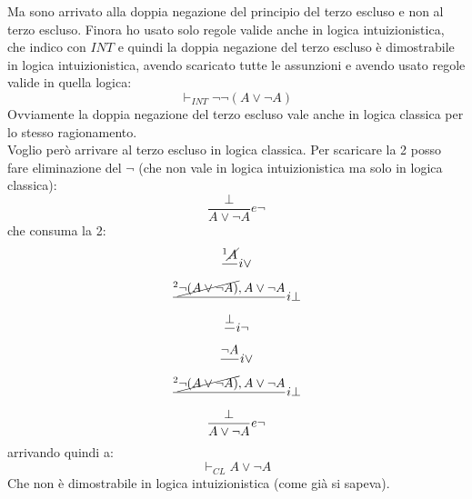\documentclass[a4paper,12pt, oneside]{book}
\begin{document}
\begin{esempio}
  Ma sono arrivato alla doppia negazione del principio del terzo escluso e non
  al terzo escluso. Finora ho usato solo regole valide anche in logica
  intuizionistica, che indico con $INT$ e quindi la doppia negazione del terzo
  escluso è dimostrabile 
  in logica intuizionistica, avendo scaricato tutte le assunzioni e avendo usato
  regole valide in quella logica:
  \[\vdash_{INT}\neg \neg(A\lor \neg A)\]
  Ovviamente la doppia negazione del terzo
  escluso vale anche in logica classica per lo stesso ragionamento.\\
  Voglio però arrivare al terzo escluso in logica classica. Per scaricare la 2
  posso fare eliminazione del $\neg$ (che non vale in logica
  intuizionistica ma solo in logica classica):
  \[\frac{\bot}{A\lor \neg A}e\neg\]
  che consuma la 2:
  \begin{gather*}
    \frac{^1\cancel{A}}{}i\lor\\
    \frac{^2\cancel{\neg(A\lor \neg A)}, A\lor \neg A}{}i\bot\\
    \frac{\bot}{}i\neg\\
    \frac{\neg A}{}i\lor\\
    \frac{^2\cancel{\neg(A\lor \neg A)}, A\lor \neg A}{}i\bot\\
    \frac{\bot}{A\lor \neg A}e\neg
  \end{gather*}
  arrivando quindi a:
  \[\vdash_{CL}A\lor \neg A\]
  Che non è dimostrabile in logica intuizionistica (come già si sapeva).
\end{esempio}
\end{document}
